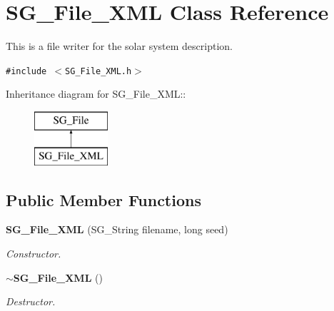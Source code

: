 \section{SG\_\-File\_\-XML Class Reference}
\label{class_s_g___file___x_m_l}
This is a file writer for the solar system description.  


{\tt \#include $<$SG\_\-File\_\-XML.h$>$}

Inheritance diagram for SG\_\-File\_\-XML::\begin{figure}[H]
\begin{center}
\leavevmode
\includegraphics[height=2cm]{class_s_g___file___x_m_l}
\end{center}
\end{figure}
\subsection*{Public Member Functions}
\begin{CompactItemize}
\item 
{\bf SG\_\-File\_\-XML} (SG\_\-String filename, long seed)\label{class_s_g___file___x_m_l_a0}

\begin{CompactList}\small\item\em Constructor. \item\end{CompactList}\item 
{\bf $\sim$SG\_\-File\_\-XML} ()\label{class_s_g___file___x_m_l_a1}

\begin{CompactList}\small\item\em Destructor. \item\end{CompactList}\end{CompactItemize}

